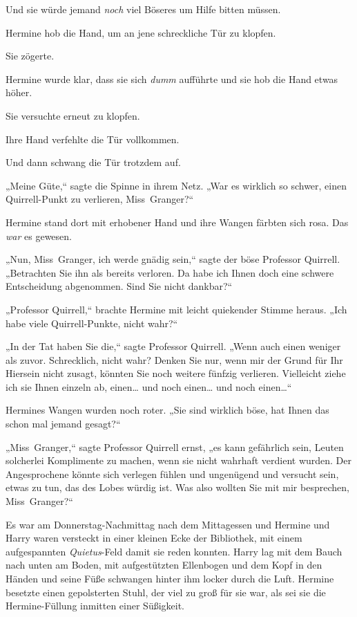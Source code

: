 {Und sie würde jemand \emph{noch} viel Böseres um Hilfe bitten müssen.

Hermine hob die Hand, um an jene schreckliche Tür zu klopfen.

Sie zögerte.

Hermine wurde klar, dass sie sich \emph{dumm} aufführte und sie hob die Hand etwas höher.

Sie versuchte erneut zu klopfen.

Ihre Hand verfehlte die Tür vollkommen.

Und dann schwang die Tür trotzdem auf.

„Meine Güte,“ sagte die Spinne in ihrem Netz. „War es wirklich so schwer, einen Quirrell-Punkt zu verlieren, Miss~Granger?“

Hermine stand dort mit erhobener Hand und ihre Wangen färbten sich rosa. Das \emph{war} es gewesen.

„Nun, Miss~Granger, ich werde gnädig sein,“ sagte der böse Professor Quirrell. „Betrachten Sie ihn als bereits verloren. Da habe ich Ihnen doch eine schwere Entscheidung abgenommen. Sind Sie nicht dankbar?“

„Professor Quirrell,“ brachte Hermine mit leicht quiekender Stimme heraus. „Ich habe viele Quirrell-Punkte, nicht wahr?“

„In der Tat haben Sie die,“ sagte Professor Quirrell. „Wenn auch einen weniger als zuvor. Schrecklich, nicht wahr? Denken Sie nur, wenn mir der Grund für Ihr Hiersein nicht zusagt, könnten Sie noch weitere fünfzig verlieren. Vielleicht ziehe ich sie Ihnen einzeln ab, einen… und noch einen… und noch einen…“

Hermines Wangen wurden noch roter. „Sie sind wirklich böse, hat Ihnen das schon mal jemand gesagt?“

„Miss~Granger,“ sagte Professor Quirrell ernst, „es kann gefährlich sein, Leuten solcherlei Komplimente zu machen, wenn sie nicht wahrhaft verdient wurden. Der Angesprochene könnte sich verlegen fühlen und ungenügend und versucht sein, etwas zu tun, das des Lobes würdig ist. Was also wollten Sie mit mir besprechen, Miss~Granger?“

\later

Es war am Donnerstag-Nachmittag nach dem Mittagessen und Hermine und Harry waren versteckt in einer kleinen Ecke der Bibliothek, mit einem aufgespannten \emph{Quietus}-Feld damit sie reden konnten. Harry lag mit dem Bauch nach unten am Boden, mit aufgestützten Ellenbogen und dem Kopf in den Händen und seine Füße schwangen hinter ihm locker durch die Luft. Hermine besetzte einen gepolsterten Stuhl, der viel zu groß für sie war, als sei sie die Hermine-Füllung inmitten einer Süßigkeit.

}
